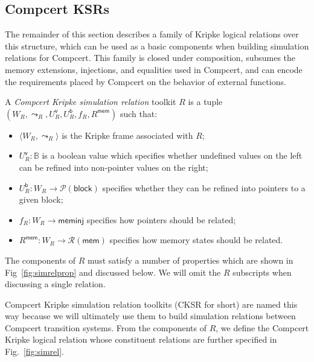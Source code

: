\documentclass[acmsmall,anonymous]{acmart}
\newcommand{\kw}[1]{\ensuremath{ \textsf{#1} }}
\begin{document}

\subsection{Compcert KSRs} %

The remainder of this section describes
a family of Kripke logical relations over this structure,
which can be used as a basic components
when building simulation relations for Compcert.
This family is closed under composition,
subsumes the memory extensions, injections, and equalities
used in Compcert,
and can encode the requirements placed by Compcert
on the behavior of external functions.

\begin{definition}
A \emph{Compcert Kripke simulation relation} toolkit $R$
is a tuple $(W_R, \leadsto_R, U^\kw{v}_R, U^\kw{b}_R, f_R, R^\kw{mem})$
such that:
\begin{itemize}
\item $\langle W_R, \leadsto_R \rangle$
  is the Kripke frame associated with $R$;
\item $U^\kw{v}_R : \mathbb{B}$
  is a boolean value which specifies whether undefined values on the left
  can be refined into non-pointer values on the right;
\item $U^\kw{b}_R : W_R \rightarrow \mathcal{P}(\kw{block})$
  specifies whether they can be refined into pointers to a given block;
\item $f_R : W_R \rightarrow \kw{meminj}$
  specifies how pointers should be related;
\item $R^\kw{mem} : W_R \rightarrow \mathcal{R}(\kw{mem})$
  specifies how memory states should be related.
\end{itemize}
The components of $R$ must satisfy
a number of properties which are shown in Fig~\ref{fig:simrelprop}
and discussed below.
We will omit the $R$ subscripts when discussing a single relation.
\end{definition}

Compcert Kripke simulation relation toolkits (CKSR for short)
are named this way because we will ultimately
use them to build simulation relations between
Compcert transition systems.
From the components of $R$,
we define the Compcert Kripke logical relation
whose constituent relations are further specified in Fig.~\ref{fig:simrel}.
\end{document}
